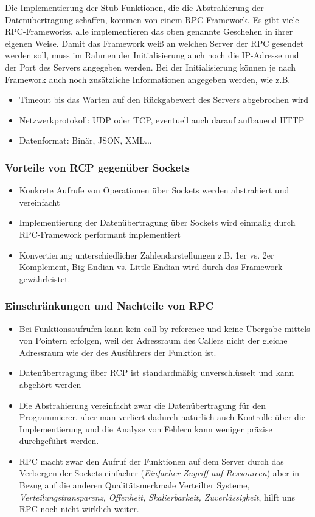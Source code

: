Die Implementierung der Stub-Funktionen, die die Abstrahierung der Datenübertragung schaffen, kommen von einem RPC-Framework. Es gibt viele RPC-Frameworks, alle implementieren das oben genannte Geschehen in ihrer eigenen Weise. Damit das Framework weiß an welchen Server der RPC gesendet werden soll, muss im Rahmen der Initialisierung auch noch die IP-Adresse und der Port des Servers angegeben werden. Bei der Initialisierung können je nach Framework auch noch zusätzliche Informationen angegeben werden, wie z.B.
\begin{itemize}
    \item Timeout bis das Warten auf den Rückgabewert des Servers abgebrochen wird
    \item Netzwerkprotokoll: UDP oder TCP, eventuell auch darauf aufbauend HTTP
    \item Datenformat: Binär, JSON, XML...
\end{itemize}

\subsubsection{Vorteile von RCP gegenüber Sockets}
\begin{itemize}
    \item Konkrete Aufrufe von Operationen über Sockets werden abstrahiert und vereinfacht
    \item Implementierung der Datenübertragung über Sockets wird einmalig durch RPC-Framework performant implementiert
    \item Konvertierung unterschiedlicher Zahlendarstellungen z.B. 1er vs. 2er Komplement, Big-Endian vs. Little Endian wird durch das Framework gewährleistet.
\end{itemize}

\subsubsection{Einschränkungen und Nachteile von RPC}
\begin{itemize}
    \item Bei Funktionsaufrufen kann kein call-by-reference und keine Übergabe mittels von Pointern erfolgen, weil der Adressraum des Callers nicht der gleiche Adressraum wie der des Ausführers der Funktion ist.
    \item Datenübertragung über RCP ist standardmäßig unverschlüsselt und kann abgehört werden
    \item Die Abstrahierung vereinfacht zwar die Datenübertragung für den Programmierer, aber man verliert dadurch natürlich auch Kontrolle über die Implementierung und die Analyse von Fehlern kann weniger präzise durchgeführt werden.
    \item RPC macht zwar den Aufruf der Funktionen auf dem Server durch das Verbergen der Sockets einfacher (\textit{Einfacher Zugriff auf Ressourcen}) aber in Bezug auf die anderen Qualitätsmerkmale Verteilter Systeme, \textit{Verteilungstransparenz, Offenheit, Skalierbarkeit, Zuverlässigkeit}, hilft uns RPC noch nicht wirklich weiter.
\end{itemize}

